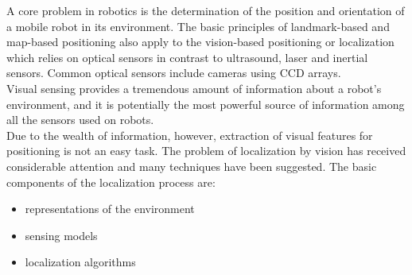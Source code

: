 A core problem in robotics is the determination of the position and
orientation of a mobile robot in its environment. The basic principles
of landmark-based and map-based positioning also apply to the vision-based
positioning or localization which relies on optical sensors
in contrast to ultrasound, laser and inertial sensors.
Common optical sensors include cameras using CCD arrays.
\\
Visual sensing provides a tremendous amount of information about a
robot's environment, and it is potentially the most powerful source of
information among all the sensors used on robots.
\\
Due to the wealth of information, however, extraction of visual features
for positioning is not an easy task. The problem of localization by vision has
received considerable attention and many techniques have been suggested.
The basic components of the localization process are:

\begin{itemize}
\item representations of the environment
\item sensing models
\item localization algorithms
\end{itemize}

